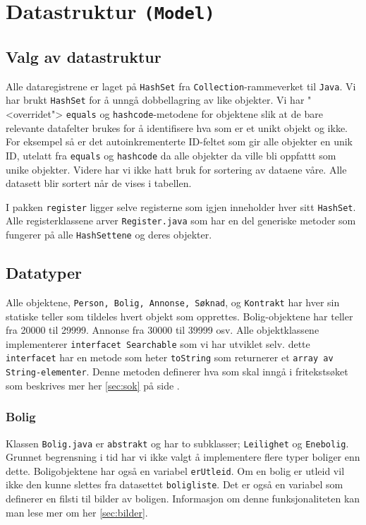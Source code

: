 \section{Datastruktur \texttt{(Model)}} \label{sec:Datastruktur}

\subsection{Valg av datastruktur}
Alle dataregistrene er laget på \texttt{HashSet} fra \texttt{Collection}-rammeverket til \texttt{Java}. Vi har brukt \texttt{HashSet} for å unngå dobbellagring av like objekter. Vi har "<overridet"> \texttt{equals} og \texttt{hashcode}-metodene for objektene slik at de bare relevante datafelter brukes for å identifisere hva som er et unikt objekt og ikke. For eksempel så er det autoinkrementerte ID-feltet som gir alle objekter en unik ID, utelatt fra \texttt{equals} og \texttt{hashcode} da alle objekter da ville bli oppfattt som unike objekter.
Videre har vi ikke hatt bruk for sortering av dataene våre. Alle datasett blir sortert når de vises i tabellen.

I pakken \texttt{register} ligger selve registerne som igjen inneholder hver sitt \texttt{HashSet}. Alle registerklassene arver \texttt{Register.java} som har en del generiske metoder som fungerer på alle \texttt{HashSettene} og deres objekter.

\subsection{Datatyper}
Alle objektene, \texttt{Person, Bolig, Annonse, Søknad}, og \texttt{Kontrakt} har hver sin statiske teller som tildeles hvert objekt som opprettes. Bolig-objektene har teller fra 20000 til 29999. Annonse fra 30000 til 39999 osv.
Alle objektklassene implementerer \texttt{interfacet Searchable} som vi har utviklet selv. dette \texttt{interfacet} har en metode som heter \texttt{toString} som returnerer et \texttt{array av String-elementer}. Denne metoden definerer hva som skal inngå i fritekstsøket som beskrives mer her \ref{sec:sok} på side \pageref{sec:sok}.

\subsubsection{Bolig}
Klassen \texttt{Bolig.java} er \texttt{abstrakt} og har to subklasser; \texttt{Leilighet} og \texttt{Enebolig}. Grunnet begrensning i tid har vi ikke valgt å implementere flere typer boliger enn dette.
Boligobjektene har også en variabel \texttt{erUtleid}. Om en bolig er utleid vil ikke den kunne slettes fra datasettet \texttt{boligliste}.
Det er også en variabel som definerer en filsti til bilder av boligen. Informasjon om denne funksjonaliteten kan man lese mer om her \ref{sec:bilder}.

